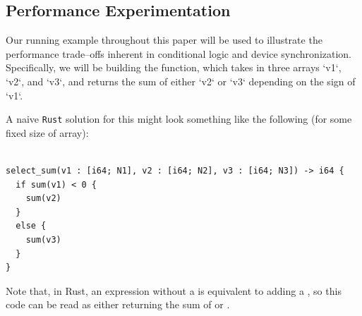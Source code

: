 \subsection{Performance Experimentation}
\label{subsec:separation}

Our running example throughout this paper will be used to illustrate the performance trade--offs inherent in conditional logic and device synchronization.  Specifically, we will be building the  function, which takes in three arrays `v1`, `v2`, and `v3`, and returns the sum of either `v2` or `v3` depending on the sign of `v1`.

A naive \texttt{Rust} solution for this might look something like the following (for some fixed size of array):
%
\begin{lstlisting}

select_sum(v1 : [i64; N1], v2 : [i64; N2], v3 : [i64; N3]) -> i64 {
  if sum(v1) < 0 {
    sum(v2)
  }
  else {
    sum(v3)
  }
}
\end{lstlisting}
%
Note that, in Rust, an expression without a \code{;} is equivalent to adding a , so this code can be read as either returning the sum of  or .


